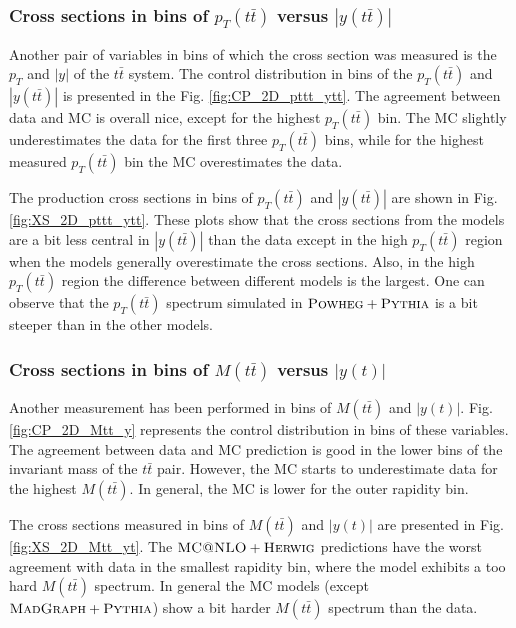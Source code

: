 
\subsubsection{Cross sections in bins of $p_{T}(t\bar{t})$ versus $|y(t\bar{t})|$}

Another pair of variables in bins of which the cross section was measured is the $p_{T}$ and $|y|$ of the $t\bar{t}$ system. 
The control distribution in bins of the $p_{T}(t\bar{t})$ and $|y(t\bar{t})|$ is presented in the Fig. \ref{fig:CP_2D_pttt_ytt}. 
The agreement between data and MC is overall nice, except for the highest $p_{T}(t\bar{t})$ bin. The MC slightly underestimates 
the data for the first three $p_{T}(t\bar{t})$ bins, while for the highest measured $p_{T}(t\bar{t})$ bin the MC overestimates the data. 

The production cross sections in bins of $p_{T}(t\bar{t})$ and $|y(t\bar{t})|$ are shown in Fig. \ref{fig:XS_2D_pttt_ytt}.
These plots show that the cross sections from the models are a bit less central in $|y(t\bar{t})|$ than the data except in the 
high $p_{T}(t\bar{t})$ region when the models generally overestimate the cross sections. Also, in the high $p_{T}(t\bar{t})$
region the difference between different models is the largest. One can observe that the $p_{T}(t\bar{t})$ spectrum simulated
in $\textsc{Powheg}+\textsc{Pythia}$ is a bit steeper than in the other models.


\subsubsection{Cross sections in bins of $M(t\bar{t})$ versus $|y(t)|$}

Another measurement has been performed in bins of $M(t\bar{t})$ and $|y(t)|$. Fig. \ref{fig:CP_2D_Mtt_y} represents the control distribution in bins of these variables.
The agreement between data and MC prediction is good in the lower bins of the invariant mass of the $t\bar{t}$ pair. 
However, the MC starts to underestimate data for the highest $M(t\bar{t})$. In general, the MC is lower for the outer rapidity 
bin. 

The cross sections measured in bins of $M(t\bar{t})$ and $|y(t)|$ are presented in Fig. \ref{fig:XS_2D_Mtt_yt}. The $\textsc{MC@NLO}+\textsc{Herwig}$ 
predictions have the worst agreement with data in the smallest rapidity bin, where the model exhibits a too hard $M(t\bar{t})$ spectrum.
In general the MC models (except $\textsc{MadGraph} + \textsc{Pythia}$) show a bit harder $M(t\bar{t})$ spectrum than the data.

